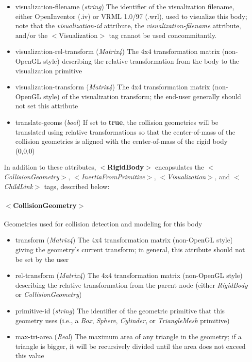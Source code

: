 \documentclass{article}
\begin{document}
\begin{landscape}
\begin{itemize}
\begin{itemize}
\item visualization-filename (\emph{string})  The identifier of the visualization filename, either OpenInventor (.iv) or VRML 1.0/97 (.wrl), used to visualize this body; note that the \emph{visualization-id} attribute, the \emph{visualization-filename} attribute, and/or the $<$Visualization$>$ tag cannot be used concommitantly.
\item visualization-rel-transform (\emph{Matrix4})  The 4x4 transformation matrix (non-OpenGL style) describing the relative transformation from the body to the visualization primitive
\item visualization-transform (\emph{Matrix4})  The 4x4 transformation matrix (non-OpenGL style) of the visualization transform; the end-user generally should not set this attribute
\item translate-geoms (\emph{bool})  If set to \textbf{true}, the collision geometries will be translated using relative transformations so that the center-of-mass of the collision geometries is aligned with the center-of-mass of the rigid body (0,0,0)
\end{itemize}
\end{itemize}

In addition to these attributes, $<$\textbf{RigidBody}$>$ encapsulates the $<$\emph{CollisionGeometry}$>$, $<$\emph{InertiaFromPrimitive}$>$, $<$\emph{Visualization}$>$, and $<$\emph{ChildLink}$>$ tags, described below:

\paragraph{$<$CollisionGeometry$>$}
Geometries used for collision detection and modeling for this body
\begin{itemize}
\item transform (\emph{Matrix4}) The 4x4 transformation matrix (non-OpenGL style) giving the geometry's current transform; in general, this attribute should not be set by the user
\item rel-transform (\emph{Matrix4}) The 4x4 transformation matrix (non-OpenGL style) describing the relative transformation from the parent node (either \emph{RigidBody} or \emph{CollisionGeometry})
\item primitive-id (\emph{string}) The identifier of the geometric primitive that this geometry uses (i.e., a \emph{Box}, \emph{Sphere}, \emph{Cylinder}, or \emph{TriangleMesh} primitive)
\item max-tri-area  (\emph{Real}) The maximum area of any triangle in the geometry; if a triangle is bigger, it will be recursively divided until the area does not exceed this value
\end{itemize}


\end{landscape}
\end{document}
